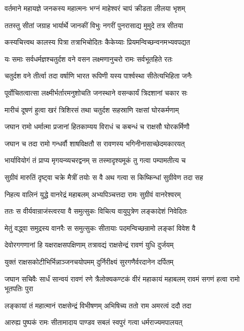 \twolineshloka
{वर्तमाने महायज्ञे जनकस्य महात्मनः}
{भग्नं माहेश्वरं चापं क्रीडता लीलया भृशम्}


\twolineshloka
{ततस्तु सीतां जग्राह भार्यार्थे जानकीं विभुः}
{नगरीं पुनरासाद्य मुमुदे तत्र सीतया}


\twolineshloka
{कस्यचित्त्वथ कालस्य पित्रा तत्राभिचोदितः}
{कैकेय्याः प्रियमन्विच्छन्वनमभ्यवपद्यत}


\twolineshloka
{यः समाः सर्वधर्मज्ञश्चतुर्दश वने वसन}
{लक्ष्मणानुचरो रामः सर्वभूतहिते रतः}


\twolineshloka
{चतुर्दश वने तीर्त्वा तदा वर्षाणि भारत}
{रूपिणी यस्य पार्श्वस्था सीतेत्यभिहिता जनैः}


\twolineshloka
{पूर्वोचितत्वात्सा लक्ष्मीर्भर्तारमनुशोचति}
{जनस्थाने वसन्कार्यं त्रिदशानां चकार सः}


\twolineshloka
{मारीचं दूषणं हुत्वा खरं त्रिशिरसं तथा}
{चतुर्दश सहस्राणि रक्षसां घोरकर्मणाम्}


\twolineshloka
{जघान रामो धर्मात्मा प्रजानां हितकाम्यय}
{विराधं च कबन्धं च राक्षसौ घोरकर्मिणौ}


\twolineshloka
{जघान च तदा रामो गन्धर्वौ शाषविक्षतौ}
{स रावणस्य भगिनीनासाच्छेदमकारयत्}


\twolineshloka
{भार्यावियोगं तं प्राप्य मृगयन्व्यचरद्वनम्}
{स तस्मादृश्यमूकं तु गत्वा पम्पामतीत्य च}


\twolineshloka
{सुग्रीवं मारुतिं दृष्ट्वा चक्रे मैत्रीं तयोः स वै}
{अथ गत्वा स किष्किन्धां सुग्रीवेण तदा सह}


\twolineshloka
{निहत्य वालिनं युद्धे वानरेद्रं महाबलम्}
{अभ्यपिञ्चत्तदा रामः सुग्रीवं वानरेश्वरम्}


\twolineshloka
{ततः स वीर्यवान्राजंस्त्वरया वै समुत्सुकः}
{विचित्य वायुपुत्रेण लङ्कादेशं निवेदितः}


\twolineshloka
{मेतुं वद्ध्वा समुद्रस्य वानरैः स समुत्सुकः}
{सीतायाः पदमन्विच्छन्रामो लङ्कां विवेश वै}


\twolineshloka
{देवोरगगणानां हि यक्षराक्षसपक्षिणाम्}
{तत्रावद्यं राक्षसेन्द्रं रावणं युधि दुर्जयम्}


\twolineshloka
{युक्तं राक्षसकोटीभिर्भिन्नाञ्जनचयोपमम्}
{दुर्निरीक्ष्यं सुरगणैर्वरदानेन दर्पितम्}


जघान सचिवैः सार्धं सान्वयं रावणं रणे
\twolineshloka
{त्रैलोक्यकण्टकं वीरं महाकायं महाबलम्}
{रावमं सगणं हत्वा रामो भूतपतिः पुरा}


\twolineshloka
{लङ्कायां तं महात्मानं राक्षसेन्द्रं विभीषणम्}
{अभिषिच्य ततो राम अमरत्वं ददौ तदा}


\twolineshloka
{आरुह्य पुष्पकं रामः सीतामादाय पाण्डव}
{सबलं स्वपुरं गत्वा धर्मराज्यमपालयत्}


